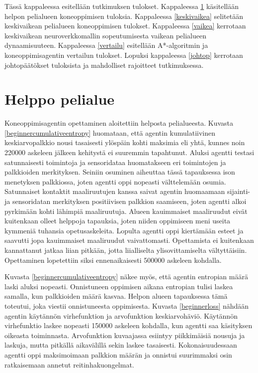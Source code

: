 \documentclass[utf8]{gradu3}
\begin{document}
Tässä kappaleessa esitellään tutkimuksen tulokset. Kappaleessa \ref{helppo} käsitellään helpon pelialueen koneoppimisen tuloksia. Kappaleessa \ref{keskivaikea} selitetään keskivaikean pelialueen koneoppimisen tulokset. Kappaleessa \ref{vaikea} kerrotaan keskivaikean neuroverkkomallin sopeutumisesta vaikean pelialueen dynaamisuuteen. Kappaleessa \ref{vertailu} esitellään A*-algoritmin ja koneoppimisagentin vertailun tulokset. Lopuksi kappaleessa \ref{johtop} kerrotaan johtopäätökset tuloksista ja mahdolliset rajoitteet tutkimuksessa.

\section{Helppo pelialue}
\label{helppo}

Koneoppimisagentin opettaminen aloitettiin helposta pelialueesta. Kuvasta \ref{beginnercumulativeentropy} huomataan, että agentin kumulatiivinen keskiarvopalkkio nousi tasaisesti ylöspäin kohti maksimia eli yhtä, kunnes noin 220000 askeleen jälkeen kehitystä ei suuremmin tapahtunut. Aluksi agentti testasi satunnaisesti toimintoja ja sensoridataa huomatakseen eri toimintojen ja palkkioiden merkityksen. Seiniin osuminen aiheuttaa tässä tapauksessa ison menetyksen palkkiossa, joten agentti oppi nopeasti välttelemään osumia. Satunnaiset kontaktit maaliruutujen kanssa saivat agentin huomaamaan sijainti- ja sensoridatan merkityksen positiivisen palkkion saamiseen, joten agentti alkoi pyrkimään kohti lähimpiä maaliruutuja. Alueen kauimmaiset maaliruudut eivät kuitenkaan olleet helppoja tapauksia, joten niiden oppimiseen meni useita kymmeniä tuhansia opetusaskeleita. Lopulta agentti oppi kiertämään esteet ja saavutti jopa kauimmaiset maaliruudut vaivattomasti. Opettamista ei kuitenkaan kannattanut jatkaa liian pitkään, jotta liialliselta ylisovittamiselta vältyttäisiin. Opettaminen lopetettiin siksi ennenaikaisesti 500000 askeleen kohdalla.

Kuvasta \ref{beginnercumulativeentropy} näkee myös, että agentin entropian määrä laski aluksi nopeasti. Onnistuneen oppimisen aikana entropian tulisi laskea samalla, kun palkkioiden määrä kasvaa. Helpon alueen tapauksessa tämä toteutui, joka viestii onnistuneesta oppimisesta. Kuvasta \ref{beginnerloss} nähdään agentin käytännön virhefunktion ja arvofunktion keskiarvohäviö. Käytännön virhefunktio laskee nopeasti 150000 askeleen kohdalla, kun agentti saa käsityksen oikeasta toiminnasta. Arvofunktion kuvaajassa esiintyy piikkimäisiä nousuja ja laskuja, mutta pitkällä aikavälillä sekin laskee tasaisesti. Kokonaisuudessaan agentti oppi maksimoimaan palkkion määrän ja onnistui suurimmaksi osin ratkaisemaan annetut reitinhakuongelmat.
\end{document}
